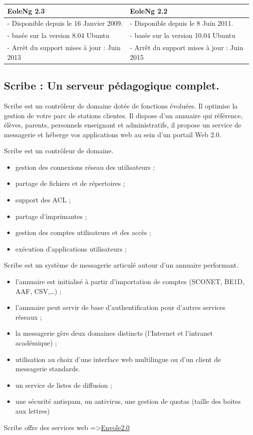 \documentclass{article}
\begin{document}
\begin{center}
\begin{tabular}{ll}
EoleNg 2.3 & EoleNg 2.2\\
\hline
- Disponible depuis le 16 Janvier 2009. & - Disponible depuis le 8 Juin
2011.\\
- basée sur la version 8.04 Ubuntu & - basée sur la version 10.04
Ubuntu\\
- Arrêt du support mises à jour : Juin 2013 & - Arrêt du support mises à
jour : Juin 2015\\
\end{tabular}
\end{center}

\subsection{Scribe : Un serveur pédagogique complet.}

Scribe est un contrôleur de domaine dotée de fonctions évoluées. Il
optimise la gestion de votre parc de stations clientes. Il dispose d'un
annuaire qui référence, élèves, parents, personnels enseignant et
administratifs, il propose un service de messagerie et héberge vos
applications web au sein d'un portail Web 2.0.

Scribe est un contrôleur de domaine.

\begin{itemize}
\item
  gestion des connexions réseau des utilisateurs ;
\item
  partage de fichiers et de répertoires ;
\item
  support des ACL ;
\item
  partage d'imprimantes ;
\item
  gestion des comptes utilisateurs et des accès ;
\item
  exécution d'applications utilisateurs ;
\end{itemize}
Scribe est un système de messagerie articulé autour d'un annuaire
performant.

\begin{itemize}
\item
  l'annuaire est initialisé à partir d'importation de comptes (SCONET,
  BE1D, AAF, CSV,\ldots{}) ;
\item
  l'annuaire peut servir de base d'authentification pour d'autres
  services réseaux ;
\item
  la messagerie gère deux domaines distincts (l'Internet et l'intranet
  académique) ;
\item
  utilisation au choix d'une interface web multilingue ou d'un client de
  messagerie standards.
\item
  un service de listes de diffusion ;
\item
  une sécurité anti­spam, un anti­virus, une gestion de quotas (taille
  des boites aux lettres)
\end{itemize}
Scribe offre des services web
=\textgreater{}\href{http://eole.orion.education.fr/projects/envole/wiki/Descriptif}{}\href{http://eole.orion.education.fr/projects/envole/wiki/Descriptif}{Envole}\href{http://eole.orion.education.fr/projects/envole/wiki/Descriptif}{2.0}
\end{document}
